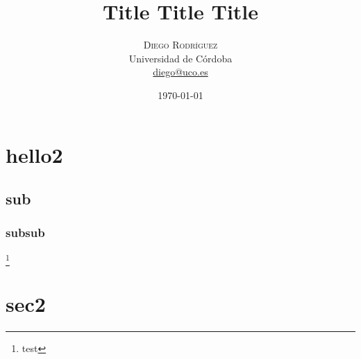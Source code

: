 \documentclass[a4paper,onecolumn]{article}
\title{Title Title Title}
\date{\today}
\author{
    \textsc{Diego Rodríguez} \\
    \normalsize Universidad de Córdoba \\
    \normalsize \href{mailto:diego@uco.es}{diego@uco.es}
}
\begin{document}
\maketitle
\pagebreak
\tableofcontents
\pagebreak
\section{hello2}
    \blindtext
    \paragraph{}\blindtext
    \subsection{sub}
        \blindtext
        \subsubsection{subsub}
            \blindtext \footnote{test}
\section{sec2}
    \blindtext
    \paragraph{}\blindtext
    \paragraph{}\blindtext
    \paragraph{}\blindtext
\end{document}
